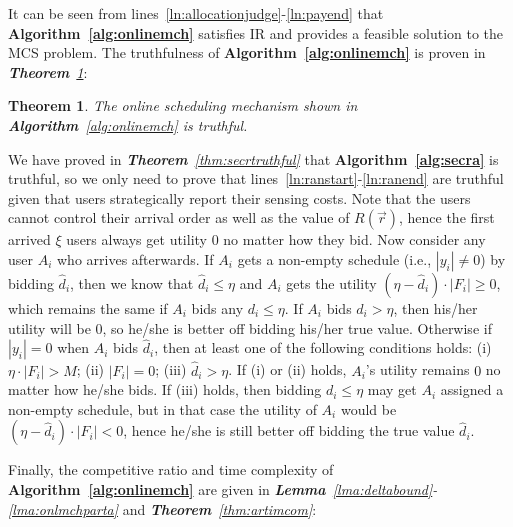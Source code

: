 \documentclass[10pt,journal,compsoc]{IEEEtran}
\newtheorem{theorem}{\textbf{Theorem}}
\begin{document}
It can be seen from lines~\ref{ln:allocationjudge}-\ref{ln:payend} that \textbf{Algorithm~\ref{alg:onlinemch}} satisfies IR and provides a feasible solution to the MCS problem. The truthfulness of \textbf{Algorithm~\ref{alg:onlinemch}} is proven in \textit{\textbf{Theorem}~\ref{thm:semitruthful}}:
\begin{theorem}
    The online scheduling mechanism shown in \textbf{Algorithm}~\ref{alg:onlinemch} is truthful.
    \label{thm:semitruthful}
  \end{theorem}
\begin{IEEEproof}
    We have proved in \textit{\textbf{Theorem}~\ref{thm:secrtruthful}} that \textbf{Algorithm~\ref{alg:secra}} is truthful, so we only need to prove that lines~\ref{ln:ranstart}-\ref{ln:ranend} are truthful given that users strategically report their sensing costs. Note that the users cannot control their arrival order as well as the value of $R(\vec{r})$, hence the first arrived $\xi$ users always get utility $0$ no matter how they bid. Now consider any user $A_i$ who arrives afterwards. If $A_i$ gets a non-empty schedule (i.e., $|y_i|\neq 0$) by bidding $\hat{d}_i$, then we know that $\hat{d}_i\leq \eta$ and $A_i$ gets the utility $(\eta-\hat{d}_i)\cdot |F_i|\geq 0$, which remains the same if $A_i$ bids any $d_i\leq \eta$. If $A_i$ bids $d_i> \eta$, then his/her utility will be $0$, so he/she is better off bidding his/her true value. Otherwise if $|y_i|= 0$ when $A_i$ bids $\hat{d}_i$, then at least one of the following conditions holds: (i) $\eta\cdot |F_i|> M$; (ii) $|F_i|=0$; (iii) $\hat{d}_i>\eta$. If (i) or (ii) holds, $A_i$'s utility remains $0$ no matter how he/she bids. If (iii) holds, then bidding $d_i\leq \eta$ may get $A_i$ assigned a non-empty schedule, but in that case the utility of $A_i$ would be $(\eta-\hat{d}_i)\cdot |F_i|<0$, hence he/she is still better off bidding the true value $\hat{d}_i$.
  \end{IEEEproof}

  Finally, the competitive ratio and time complexity of \textbf{Algorithm~\ref{alg:onlinemch}} are given in \textit{\textbf{Lemma}~\ref{lma:deltabound}-\ref{lma:onlmchparta}} and \textit{\textbf{Theorem}~\ref{thm:artimcom}}:
\end{document}
